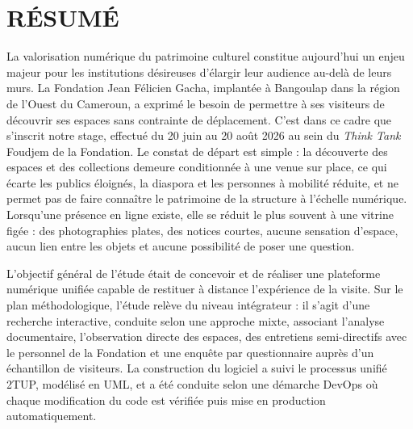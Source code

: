 \cleardoublepage
{}
\chapter*{RÉSUMÉ}

\begingroup
{}

La valorisation numérique du patrimoine culturel constitue aujourd'hui un enjeu
majeur pour les institutions désireuses d'élargir leur audience au-delà de leurs
murs. La Fondation Jean Félicien Gacha, implantée à Bangoulap dans la région de
l'Ouest du Cameroun, a exprimé le besoin de permettre à ses visiteurs de
découvrir ses espaces sans contrainte de déplacement. C'est dans ce cadre que
s'inscrit notre stage, effectué du 20 juin au 20 août 2026 au sein du
\emph{Think Tank} Foudjem de la Fondation. Le constat de départ est simple :
la découverte des espaces et des collections demeure conditionnée à une venue
sur place, ce qui écarte les publics éloignés, la diaspora et les personnes à
mobilité réduite, et ne permet pas de faire connaître le patrimoine de la
structure à l'échelle numérique. Lorsqu'une présence en ligne existe, elle se
réduit le plus souvent à une vitrine figée : des photographies plates, des
notices courtes, aucune sensation d'espace, aucun lien entre les objets et
aucune possibilité de poser une question.

L'objectif général de l'étude était de concevoir et de réaliser une plateforme
numérique unifiée capable de restituer à distance l'expérience de la visite.
Sur le plan méthodologique, l'étude relève du niveau intégrateur : il s'agit
d'une recherche interactive, conduite selon une approche mixte, associant
l'analyse documentaire, l'observation directe des espaces, des entretiens
semi-directifs avec le personnel de la Fondation et une enquête par
questionnaire auprès d'un échantillon de visiteurs. La construction du logiciel
a suivi le processus unifié 2TUP, modélisé en UML, et a été conduite selon une
démarche DevOps où chaque modification du code est vérifiée puis mise en
production automatiquement.

